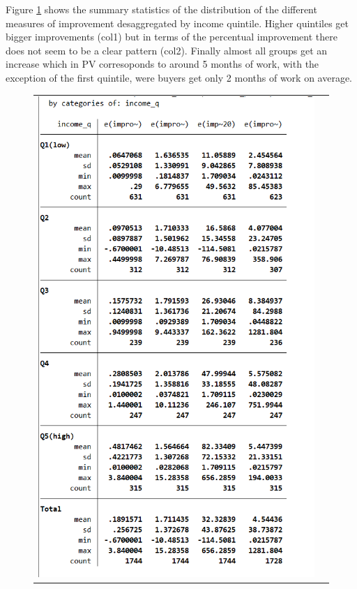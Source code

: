 \documentclass[12pt]{article}
\begin{document}
Figure \ref{fig:aux2} shows the summary statistics of the distribution of the different measures of improvement desaggregated by income quintile. Higher quintiles get bigger improvements (col1) but in terms of the percentual improvement there does not seem to be a clear pattern (col2). Finally almost all groups get an increase which in PV corresoponds to around 5 months of work, with the exception of the first quintile, were buyers get only 2 months of work on average. 
\begin{figure}[H]
\caption{}
\label{fig:aux2}
\centering{}%
\begin{tabular}{cc}
\includegraphics[scale=0.7]{../Tables/IE3_offer_improvement_byincomequintile.png}
\end{tabular}
\end{figure}
\end{document}

